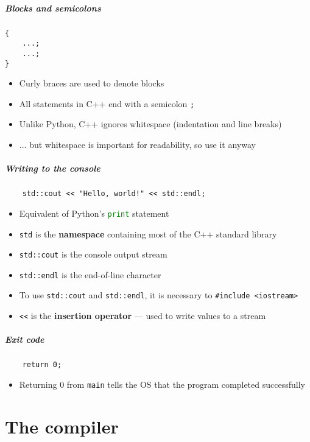 \documentclass[xcolor={dvipsnames}]{beamer}\usepackage{etoolbox}\newtoggle{printable}\togglefalse{printable}
\begin{document}
\begin{frame}[fragile]
	\frametitle{Blocks and semicolons}
	\begin{lstlisting}
{
    ...;
    ...;
}
	\end{lstlisting}
	\begin{itemize}
		\item Curly braces are used to denote blocks
		\item All statements in C++ end with a semicolon \lstinline{;}
		\item Unlike Python, C++ ignores whitespace (indentation and line breaks)
		\item ... but whitespace is important for readability, so use it anyway
	\end{itemize}
\end{frame}

\begin{frame}[fragile]
	\frametitle{Writing to the console}
	\begin{lstlisting}
    std::cout << "Hello, world!" << std::endl;
	\end{lstlisting}
	\begin{itemize}
		\item Equivalent of Python's \lstinline[language=Python]{print} statement
		\item \lstinline{std} is the \textbf{namespace} containing most of the C++ standard library
		\item \lstinline{std::cout} is the console output stream
		\item \lstinline{std::endl} is the end-of-line character
		\item To use \lstinline{std::cout} and \lstinline{std::endl}, it is necessary to
			\lstinline{#include <iostream>}
		\item \lstinline{<<} is the \textbf{insertion operator} --- used to write values to a stream
	\end{itemize}
\end{frame}

\begin{frame}[fragile]
	\frametitle{Exit code}
	\begin{lstlisting}
    return 0;
	\end{lstlisting}
	\begin{itemize}
		\item Returning 0 from \lstinline{main} tells the OS that the program completed successfully
	\end{itemize}
\end{frame}


\part{The compiler}
\frame{\partpage}
\end{document}
